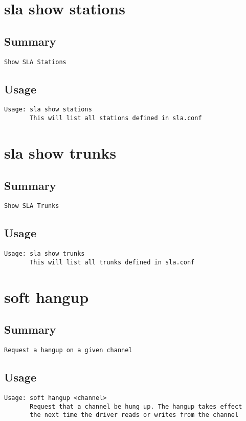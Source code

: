 \section{sla show stations}
\subsection{Summary}
\begin{verbatim}
Show SLA Stations
\end{verbatim}
\subsection{Usage}
\begin{verbatim}
Usage: sla show stations
       This will list all stations defined in sla.conf

\end{verbatim}


\section{sla show trunks}
\subsection{Summary}
\begin{verbatim}
Show SLA Trunks
\end{verbatim}
\subsection{Usage}
\begin{verbatim}
Usage: sla show trunks
       This will list all trunks defined in sla.conf

\end{verbatim}


\section{soft hangup}
\subsection{Summary}
\begin{verbatim}
Request a hangup on a given channel
\end{verbatim}
\subsection{Usage}
\begin{verbatim}
Usage: soft hangup <channel>
       Request that a channel be hung up. The hangup takes effect
       the next time the driver reads or writes from the channel

\end{verbatim}


